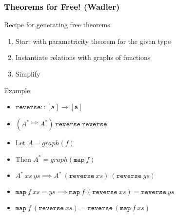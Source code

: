 \documentclass[english]{beamer}
\begin{document}
\begin{frame}
\frametitle{Theorems for Free! (Wadler)}
Recipe for generating free theorems:
\begin{enumerate}
\item Start with parametricity theorem for the given type
\item Instantiate relations with graphs of functions
\item Simplify
\end{enumerate}
\bigskip
\pause
Example:
\begin{itemize}
\item $\mathtt{reverse} :: [\mathtt{a}] \to [\mathtt{a}]$
\item $(A^{*} \Mapsto A^{*})\:\mathtt{reverse}\:\mathtt{reverse}$
\item Let $A = \mathit{graph}(f)$
\item Then $A^{*} = \mathit{graph}(\mathtt{map}\:f)$
\item $A^{*}\:xs\:ys \implies A^{*}\:(\mathtt{reverse}\:xs)\:(\mathtt{reverse}\:ys)$
\item $\mathtt{map}\:f\:xs = ys \implies \mathtt{map}\:f\:(\mathtt{reverse}\:xs) = \mathtt{reverse}\:ys$
\item $\mathtt{map}\:f\:(\mathtt{reverse}\:xs) = \mathtt{reverse}\:(\mathtt{map}\:f\:xs)$
\end{itemize}
\end{frame}
\end{document}
